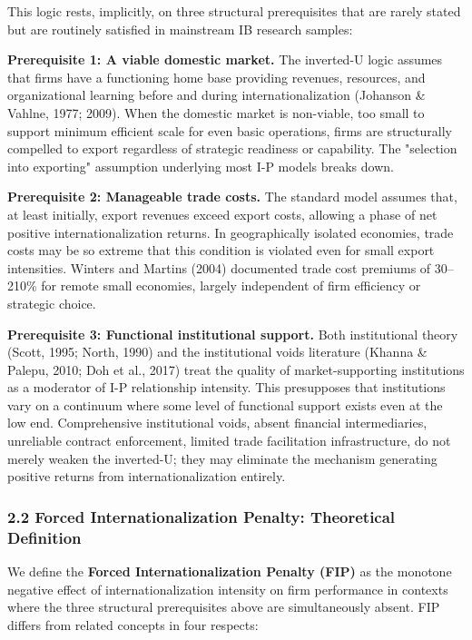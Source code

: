 \documentclass[12pt,a4paper]{article}
\begin{document}
This logic rests, implicitly, on three structural prerequisites that are
rarely stated but are routinely satisfied in mainstream IB research
samples:

\textbf{Prerequisite 1: A viable domestic market.} The inverted-U logic
assumes that firms have a functioning home base providing revenues,
resources, and organizational learning before and during
internationalization (Johanson \& Vahlne, 1977; 2009). When the domestic
market is non-viable, too small to support minimum efficient scale for
even basic operations, firms are structurally compelled to export
regardless of strategic readiness or capability. The "selection into
exporting" assumption underlying most I-P models breaks down.

\textbf{Prerequisite 2: Manageable trade costs.} The standard model
assumes that, at least initially, export revenues exceed export costs,
allowing a phase of net positive internationalization returns. In
geographically isolated economies, trade costs may be so extreme that
this condition is violated even for small export intensities. Winters
and Martins (2004) documented trade cost premiums of 30--210\% for
remote small economies, largely independent of firm efficiency or
strategic choice.

\textbf{Prerequisite 3: Functional institutional support.} Both
institutional theory (Scott, 1995; North, 1990) and the institutional
voids literature (Khanna \& Palepu, 2010; Doh et al., 2017) treat the
quality of market-supporting institutions as a moderator of I-P
relationship intensity. This presupposes that institutions vary on a
continuum where some level of functional support exists even at the low
end. Comprehensive institutional voids, absent financial intermediaries,
unreliable contract enforcement, limited trade facilitation
infrastructure, do not merely weaken the inverted-U; they may eliminate
the mechanism generating positive returns from internationalization
entirely.

\hypertarget{22-forced-internationalization-penalty-theoretical-definition}{%
\subsubsection{2.2 Forced Internationalization Penalty: Theoretical
Definition}\label{22-forced-internationalization-penalty-theoretical-definition}}

We define the \textbf{Forced Internationalization Penalty (FIP)} as the
monotone negative effect of internationalization intensity on firm
performance in contexts where the three structural prerequisites above
are simultaneously absent. FIP differs from related concepts in four
respects:
\end{document}
